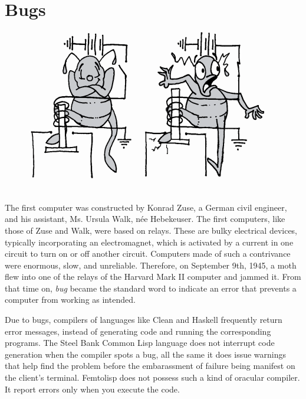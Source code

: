 \documentclass[a4paper,12pt]{book}
\begin{document}
\section{Bugs}
\begin{figure}
\includegraphics[scale=0.5]{fig-sets/bugcerto.png}
\end{figure}
The first computer was 
constructed
by Konrad Zuse,
a German civil engineer, and his assistant,
Ms. Ursula Walk, née Hebekeuser.
The first computers, like those of Zuse and Walk,
were based on relays.
These are
bulky electrical devices, typically incorporating
an electromagnet, which is activated by a current
in one circuit to turn on or off another circuit.
Computers made of such a contrivance were enormous,
slow, and unreliable. Therefore, on September 9th, 1945,
a moth flew into one of the relays of the Harvard  Mark II
computer and jammed it. From that time on,   {\em bug}
became the standard word to indicate
an error that prevents a computer from working as intended.

Due to bugs, compilers of languages like Clean
and Haskell frequently return error messages,
instead of generating code and running the
corresponding programs. The Steel Bank Common Lisp language
does not interrupt code generation when the
compiler spots a bug, all the same
it does issue warnings
that help find the problem before the embarassment
of failure being manifest on the client's terminal.
Femtolisp does not possess such a kind of oracular
compiler. It report errors only when you execute
the code.
\end{document}
